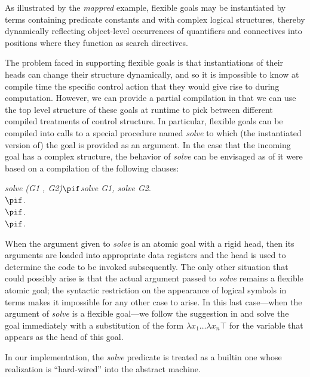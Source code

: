 As illustrated by the {\it mappred} example, flexible goals may be
instantiated by terms containing predicate constants and with complex
logical structures, thereby dynamically
reflecting object-level occurrences of quantifiers and connectives into
positions where they function as search directives.

The problem faced in supporting flexible goals is that instantiations of
their heads can change their structure  dynamically, and so it is
impossible to know at compile time the specific control action that
they would give rise to during computation.
However, we can provide a partial compilation in that we can use the
top level structure of these goals at runtime to pick between
different compiled treatments of control structure. In particular,
flexible goals
can be compiled into calls to a special procedure named {\it solve} to which
(the instantiated version of) the goal is provided as an argument. In the case
that the incoming goal has a complex structure, the behavior of {\it solve}
can be envisaged as of it were based on a compilation of the following
clauses:
\begin{tabbing}
\dquad\dquad\={\it solve (G1 , G2)}\dquad\=$\pif$\quad\={\it solve G1, solve G2}.\\
\>$\pif$.\\
\>$\pif$.\\
\>$\pif$.
\end{tabbing}
When the argument given to {\it solve} is an atomic goal with a rigid head,
then its arguments are loaded into appropriate data registers and the head is
used to determine the code to be invoked subsequently. The only other situation
that could possibly arise is that the actual argument passed to {\it
  solve} remains a flexible atomic goal; the syntactic restriction on
the appearance of logical symbols in terms makes it impossible for
any other case to arise. In this last case---when the argument of {\it
  solve} is a flexible goal---we follow the suggestion in
\cite{NM98Handbook} and solve the goal immediately with a substitution
of the form $\lambda x_1\ldots\lambda x_n\top$ for the variable that
appears as the head of this goal.

In our implementation, the {\it solve} predicate is
treated as a builtin one whose realization is ``hard-wired'' into
the abstract machine.

